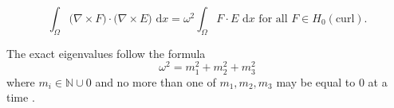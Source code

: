 \documentclass[format=acmsmall,screen,timestamp=false,a4paper]{acmart}
\newcommand{\R}{\mathbb{R}}
\newcommand\akg[1]{\textbf{\textcolor[rgb]{.5,0,1}{[Andrew: #1]}}}
\begin{document}



\begin{equation*}
    \int_\Omega \big(\nabla \times F\big) \cdot \big(\nabla \times E \big) \text{ d}x = \omega^2 \int_\Omega F \cdot E \text{ d}x \text{ for all } F \in H_0(\text{curl}).
\end{equation*}


\noindent The exact eigenvalues follow the formula
\[ \omega^2 = m_1^2 + m_2^2 + m_3^2 \]
where $m_i \in \mathbb{N} \cup {0}$ and no more than one of $m_1, m_2, m_3$ may be equal to $0$ at a time \cite{rognes2010efficient}.

\end{document}
